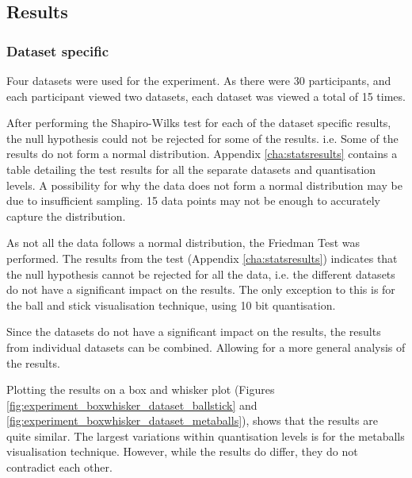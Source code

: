 
\subsection{Results}
\label{sub:experiment_results}

\subsubsection{Dataset specific}
\label{ssub:experiment_results_dataset}

Four datasets were used for the experiment. As there were 30 participants, and
each participant viewed two datasets, each dataset was viewed a total of 15
times.

After performing the Shapiro-Wilks test for each of the dataset specific
results, the null hypothesis could not be rejected for some of the results.
i.e. Some of the results do not form a normal distribution. Appendix
\ref{cha:statsresults} contains a table detailing the test results for all the
separate datasets and quantisation levels. A possibility for why the data does
not form a normal distribution may be due to insufficient sampling. 15 data
points may not be enough to accurately capture the distribution.

As not all the data follows a normal distribution, the Friedman Test was
performed. The results from the test (Appendix \ref{cha:statsresults})
indicates that the null hypothesis cannot be rejected for all the data, i.e.
the different datasets do not have a significant impact on the results. The
only exception to this is for the ball and stick visualisation technique, using
10 bit quantisation.

Since the datasets do not have a significant impact on the results, the results
from individual datasets can be combined. Allowing for a more general analysis
of the results.

Plotting the results on a box and whisker plot (Figures
\ref{fig:experiment_boxwhisker_dataset_ballstick} and
\ref{fig:experiment_boxwhisker_dataset_metaballs}), shows that the results are
quite similar. The largest variations within quantisation levels is for the
metaballs visualisation technique. However, while the results do differ, they
do not contradict each other.

